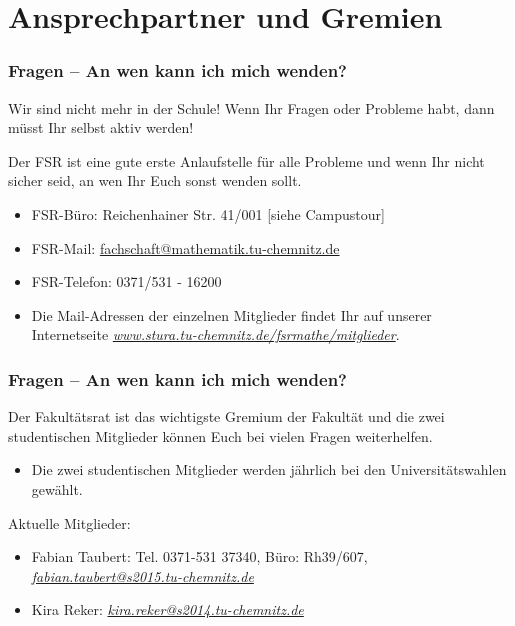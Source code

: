 \documentclass[10pt]{beamer}
\begin{document}
\section{Ansprechpartner und Gremien}
\frame{\tableofcontents[currentsection]}

\begin{frame}
\frametitle{Fragen -- An wen kann ich mich wenden?}
Wir sind nicht mehr in der Schule! Wenn Ihr Fragen oder Probleme habt, dann müsst Ihr selbst aktiv werden!
\begin{block}{\vphantom{X}}
	Der FSR ist eine gute erste Anlaufstelle für alle Probleme und wenn Ihr nicht sicher seid, an wen Ihr Euch sonst wenden sollt.
\end{block}
\begin{itemize}
	\item FSR-Büro: Reichenhainer Str. 41/001 [siehe Campustour]
	\item FSR-Mail: \href{mailto:fachschaft@mathematik.tu-chemnitz.de}{fachschaft@mathematik.tu-chemnitz.de} 
	\item FSR-Telefon: 0371/531 - 16200
	\item Die Mail-Adressen der einzelnen Mitglieder findet Ihr auf unserer Internetseite \textit{\href{https://www.stura.tu-chemnitz.de/fsrmathe/mitglieder}{www.stura.tu-chemnitz.de/fsrmathe/mitglieder}}.
\end{itemize}
\end{frame}

\begin{frame}
\frametitle{Fragen -- An wen kann ich mich wenden?}
\begin{block}{\vphantom{X}}
	Der Fakultätsrat ist das wichtigste Gremium der Fakultät und die zwei studentischen Mitglieder können Euch bei vielen Fragen weiterhelfen.
\end{block}
\begin{itemize}
	\item Die zwei studentischen Mitglieder werden jährlich bei den Universitätswahlen gewählt.
\end{itemize}
Aktuelle Mitglieder:
\begin{itemize}
	\item Fabian Taubert: Tel. 0371-531 37340, Büro: Rh39/607, \textit{\href{mailto:fabian.taubert@s2015.tu-chemnitz.de}{fabian.taubert@s2015.tu-chemnitz.de}}
	\item Kira Reker: \textit{\href{mailto:kira.reker@s2014.tu-chemnitz.de}{kira.reker@s2014.tu-chemnitz.de}}   
\end{itemize}
\end{frame}
\end{document}
